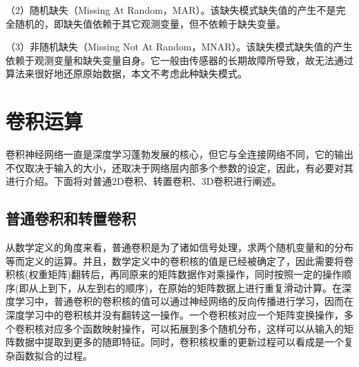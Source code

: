 （2）随机缺失（Missing At Random，MAR）。该缺失模式缺失值的产生不是完全随机的，即缺失值依赖于其它观测变量，但不依赖于缺失变量。

（3）非随机缺失（Missing Not At Random，MNAR）。该缺失模式缺失值的产生依赖于观测变量和缺失变量自身。它一般由传感器的长期故障所导致，故无法通过算法来很好地还原原始数据，本文不考虑此种缺失模式。


%

\section{卷积运算}
卷积神经网络一直是深度学习蓬勃发展的核心，但它与全连接网络不同，它的输出不仅取决于输入的大小，还取决于网络层内部多个参数的设定，因此，有必要对其进行介绍。下面将对普通2D卷积、转置卷积、3D卷积进行阐述。
\subsection{普通卷积和转置卷积}
从数学定义的角度来看，普通卷积是为了诸如信号处理，求两个随机变量和的分布等而定义的运算。并且，数学定义中的卷积核的值是已经被确定了，因此需要将卷积核(权重矩阵)翻转后，再同原来的矩阵数据作对乘操作，同时按照一定的操作顺序(即从上到下，从左到右的顺序)，在原始的矩阵数据上进行重复滑动计算。在深度学习中，普通卷积的卷积核的值可以通过神经网络的反向传播进行学习，因而在深度学习中的卷积核并没有翻转这一操作。一个卷积核对应一个矩阵变换操作，多个卷积核对应多个函数映射操作，可以拓展到多个随机分布，这样可以从输入的矩阵数据中提取到更多的随即特征。同时，卷积核权重的更新过程可以看成是一个复杂函数拟合的过程。

